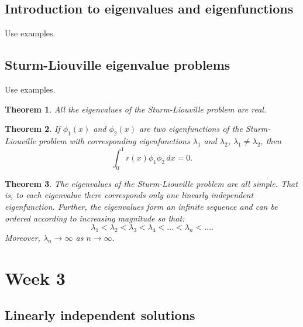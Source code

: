 \documentclass{article}
\newtheorem{theorem}{Theorem}
\begin{document}
\subsection{Introduction to eigenvalues and eigenfunctions}
Use examples.

\subsection{Sturm-Liouville eigenvalue problems}
Use examples.

\begin{theorem}
    All the eigenvalues of the Sturm-Liouville problem are real.
\end{theorem}

\begin{theorem}
    If $\phi_1(x)$ and $\phi_2(x)$ are two eigenfunctions of the Sturm-Liouville problem with corresponding eigenfunctions $\lambda_1$ and $\lambda_2$, $\lambda_1\neq \lambda_2$, then
    \begin{equation}
        \int_0^1 r(x)\phi_1 \phi_2\,dx=0.
    \end{equation}
\end{theorem}
\begin{theorem}
    The eigenvalues of the Sturm-Liouville problem are all simple. That is, to each eigenvalue there corresponds only one linearly independent eigenfunction. Further, the eigenvalues form an infinite sequence and can be ordered according to increasing magnitude so that:
    \begin{equation}
        \lambda_1<\lambda_2<\lambda_3<\lambda_4<\ldots<\lambda_n<\ldots.
    \end{equation}
    Moreover, $\lambda_n\to\infty$ as $n\to\infty$.
\end{theorem}



\section{Week 3}


\subsection{Linearly independent solutions}
\end{document}
